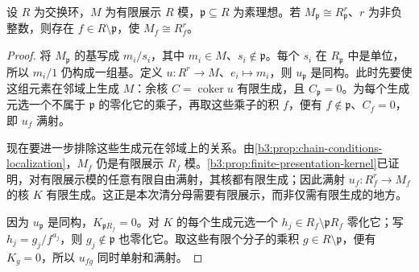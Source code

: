 \begin{lemma}\label{b3:lem:free-stalk-neighborhood}
	设 \(R\) 为交换环，\(M\) 为有限展示 \(R\) 模，\(\mathfrak p\subseteq R\) 为素理想。若 \(M_{\mathfrak p}\cong R_{\mathfrak p}^r\)、\(r\) 为非负整数，则存在 \(f\in R\setminus\mathfrak p\)，使 \(M_f\cong R_f^r\)。
\end{lemma}
\begin{proof}
	将 \(M_{\mathfrak p}\) 的基写成 \(m_i/s_i\)，其中 \(m_i\in M\)、\(s_i\notin\mathfrak p\)。每个 \(s_i\) 在 \(R_{\mathfrak p}\) 中是单位，所以 \(m_i/1\) 仍构成一组基。定义 \(u:R^r\to M\)、\(e_i\mapsto m_i\)，则 \(u_{\mathfrak p}\) 是同构。此时先要使这组元素在邻域上生成 \(M\)：余核 \(C=\operatorname{coker}u\) 有限生成，且 \(C_{\mathfrak p}=0\)。为每个生成元选一个不属于 \(\mathfrak p\) 的零化它的乘子，再取这些乘子的积 \(f\)，便有 \(f\notin\mathfrak p\)、\(C_f=0\)，即 \(u_f\) 满射。

	现在要进一步排除这些生成元在邻域上的关系。由\cref{b3:prop:chain-conditions-localization}，\(M_f\) 仍是有限展示 \(R_f\) 模。\cref{b3:prop:finite-presentation-kernel}已证明，对有限展示模的任意有限自由满射，其核都有限生成；因此满射 \(u_f:R_f^r\to M_f\) 的核 \(K\) 有限生成。这正是本次清分母需要有限展示，而非仅需有限生成的地方。

	因为 \(u_{\mathfrak p}\) 是同构，\(K_{\mathfrak pR_f}=0\)。对 \(K\) 的每个生成元选一个 \(h_j\in R_f\setminus\mathfrak pR_f\) 零化它；写 \(h_j=g_j/f^{a_j}\)，则 \(g_j\notin\mathfrak p\) 也零化它。取这些有限个分子的乘积 \(g\in R\setminus\mathfrak p\)，便有 \(K_g=0\)，所以 \(u_{fg}\) 同时单射和满射。
\end{proof}

